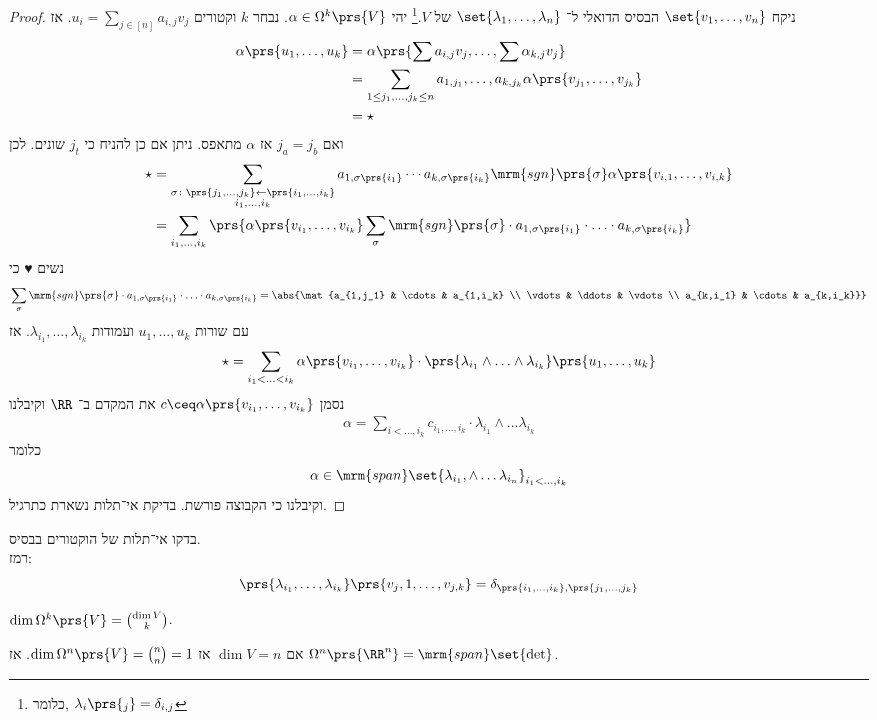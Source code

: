\documentclass[a4paper,10pt,twoside,openany]{book}
\begin{document}
\begin{proof}
ניקח
$\set{v_1, \ldots, v_n}$
הבסיס הדואלי ל־%
$\set{\lambda_1, \ldots, \lambda_n}$
של
$V$.\footnote{
כלומר,
$\lambda_i\prs{_j} = \delta_{i,j}$
}
יהי
$\alpha \in \Omega^k\prs{V}$.
נבחר
$k$
וקטורים
$u_{i} = \sum_{j \in [n]} a_{i,j}v_j$.
אז
\begin{align*}
\alpha\prs{u_1, \ldots, u_k} &= \alpha\prs{\sum a_{i,j} v_j, \ldots, \sum \alpha_{k,j} v_j} \\&=
\sum_{1 \leq j_1, \ldots, j_k \leq n} a_{1,j_1}, \ldots, a_{k,j_k} \alpha\prs{v_{j_1}, \ldots, v_{j_k}} \\&= \star
\end{align*}
ואם
$j_a = j_b$
אז
$\alpha$
מתאפס.
ניתן אם כן להניח כי
$j_t$
שונים.
לכן
\begin{align*}
\star &= \sum_{\substack{\sigma \colon \prs{j_1, \ldots, j_k} \leftarrow \prs{i_1, \ldots, i_k} \\ i_1, \ldots, i_k}} a_{1,\sigma\prs{i_1}} \cdots a_{k,\sigma\prs{i_k}} \mrm{sgn}\prs{\sigma} \alpha\prs{v_{i,1}, \ldots, v_{i,k}} \\
&= \sum_{i_1, \ldots, i_k} \prs{\alpha\prs{v_{i_1}, \ldots, v_{i_k}} \sum_{\sigma} \mrm{sgn}\prs{\sigma} \cdot a_{1,\sigma\prs{i_1}} \cdot \ldots \cdot a_{k,\sigma\prs{i_k}}}
\end{align*}
נשים ♥ כי
\[\sum_{\sigma} \mrm{sgn}\prs{\sigma} \cdot a_{1,\sigma\prs{i_1}} \cdot \ldots \cdot a_{k,\sigma\prs{i_k}} = \abs{\mat{a_{1,j_1} & \cdots & a_{1,i_k} \\ \vdots & \ddots & \vdots \\ a_{k,i_1} & \cdots & a_{k,i_k}}}\]
עם שורות
$u_1, \ldots, u_k$
ועמודות
$\lambda_{i_1}, \ldots, \lambda_{i_k}$.
אז
\[\star = \sum_{i_1< \ldots <i_k} \alpha\prs{v_{i_1}, \ldots, v_{i_k}} \cdot \prs{\lambda_{i_1} \wedge \ldots \wedge \lambda_{i_k}}\prs{u_1, \ldots, u_k}\]
נסמן
$c \ceq \alpha\prs{v_{i_1}, \ldots, v_{i_k}}$
את המקדם ב־%
$\RR$
וקיבלנו
\begin{align*}
\alpha = \sum_{i < \ldots, i_k} c_{i_1, \ldots, i_k} \cdot \lambda_{i_1} \wedge \ldots \lambda_{i_k}
\end{align*}
כלומר
\[\alpha \in \mrm{span}\set{\lambda_{i_1}, \wedge \ldots \lambda_{i_n}}_{i_1 < \ldots, i_k}\]
וקיבלנו כי הקבוצה פורשת.
בדיקת אי־תלות נשארת כתרגיל.
\end{proof}
\begin{exercise}
בדקו אי־תלות של הוקטורים בבסיס.
\\
רמז:
\[\prs{\lambda_{i_1}, \ldots, \lambda_{i_k}} \prs{v_j,1, \ldots, v_{j,k}} = \delta_{\prs{i_1, \ldots, i_k},\prs{j_1, \ldots, j_k}}\]
\end{exercise}
\begin{corollary}
$\dim \Omega^k \prs{V} = \binom{\dim V}{k}$.
\end{corollary}
\begin{corollary}
אם
$\dim V = n$
אז
$\dim \Omega^n \prs{V} = \binom{n}{n} = 1$.
אז
$\Omega^n\prs{\RR^n} = \mrm{span}\set{\det}$.
\end{corollary}
\end{document}
